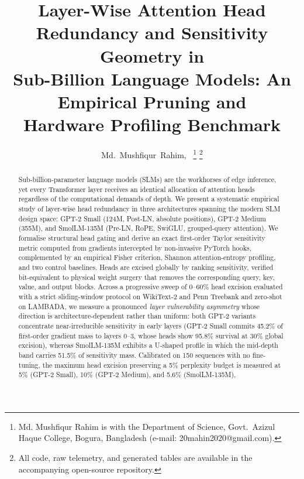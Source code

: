 \documentclass[10pt,journal,compsoc]{IEEEtran}
\begin{document}
\title{Layer-Wise Attention Head Redundancy and Sensitivity Geometry in\\
Sub-Billion Language Models: An Empirical Pruning and\\ Hardware Profiling Benchmark}

\author{Md.~Mushfiqur~Rahim,~%
\thanks{Md. Mushfiqur Rahim is with the Department of Science, Govt.\ Azizul Haque College, Bogura, Bangladesh (e-mail: 20mahin2020@gmail.com).}%
\thanks{All code, raw telemetry, and generated tables are available in the accompanying open-source repository.}}

\maketitle

\begin{abstract}
Sub-billion-parameter language models (SLMs) are the workhorses of edge inference,
yet every Transformer layer receives an identical allocation of attention heads
regardless of the computational demands of depth. We present a systematic empirical
study of layer-wise head redundancy in three architectures spanning the modern SLM
design space: GPT-2 Small (124M, Post-LN, absolute positions), GPT-2 Medium
(355M), and SmolLM-135M (Pre-LN, RoPE, SwiGLU, grouped-query attention). We formalise
structural head gating and derive an exact first-order Taylor sensitivity metric
computed from gradients intercepted by non-invasive PyTorch hooks, complemented by an
empirical Fisher criterion, Shannon attention-entropy profiling, and two control
baselines. Heads are excised globally by ranking sensitivity, verified bit-equivalent
to physical weight surgery that removes the corresponding query, key, value, and
output blocks. Across a progressive sweep of $0$--$60\%$ head excision evaluated with
a strict sliding-window protocol on WikiText-2 and Penn Treebank and zero-shot on
LAMBADA, we measure a pronounced \emph{layer vulnerability asymmetry} whose direction is
architecture-dependent rather than uniform: both GPT-2 variants concentrate
near-irreducible sensitivity in early layers (GPT-2 Small commits 45.2\% of
first-order gradient mass to layers 0--3, whose heads show 95.8\% survival at 30\%
global excision), whereas SmolLM-135M exhibits a U-shaped profile in which the
mid-depth band carries 51.5\% of sensitivity mass. Calibrated on 150 sequences with
no fine-tuning, the maximum head excision preserving a 5\% perplexity budget is
measured at 5\% (GPT-2 Small), 10\% (GPT-2 Medium), and 5.6\% (SmolLM-135M),

\end{abstract}
\end{document}
